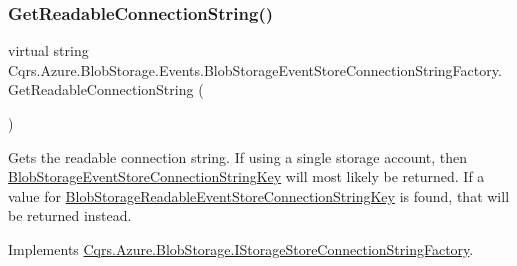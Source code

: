 \mbox{\label{classCqrs_1_1Azure_1_1BlobStorage_1_1Events_1_1BlobStorageEventStoreConnectionStringFactory_aa47606e4cd5a71437bed71e07fda53ed_aa47606e4cd5a71437bed71e07fda53ed}} 
\subsubsection{\texorpdfstring{Get\+Readable\+Connection\+String()}{GetReadableConnectionString()}}
{\footnotesize\ttfamily virtual string Cqrs.\+Azure.\+Blob\+Storage.\+Events.\+Blob\+Storage\+Event\+Store\+Connection\+String\+Factory.\+Get\+Readable\+Connection\+String (\begin{DoxyParamCaption}{ }\end{DoxyParamCaption})\hspace{0.3cm}{\ttfamily [virtual]}}



Gets the readable connection string. If using a single storage account, then \hyperlink{classCqrs_1_1Azure_1_1BlobStorage_1_1Events_1_1BlobStorageEventStoreConnectionStringFactory_a36edb24cf0ef60114fc344b5d0bb619d_a36edb24cf0ef60114fc344b5d0bb619d}{Blob\+Storage\+Event\+Store\+Connection\+String\+Key} will most likely be returned. If a value for \hyperlink{classCqrs_1_1Azure_1_1BlobStorage_1_1Events_1_1BlobStorageEventStoreConnectionStringFactory_a2b233edf7ad4cbc29872757006319527_a2b233edf7ad4cbc29872757006319527}{Blob\+Storage\+Readable\+Event\+Store\+Connection\+String\+Key} is found, that will be returned instead. 



Implements \hyperlink{interfaceCqrs_1_1Azure_1_1BlobStorage_1_1IStorageStoreConnectionStringFactory_a0ed836289e048767f753630bbcc98d5d_a0ed836289e048767f753630bbcc98d5d}{Cqrs.\+Azure.\+Blob\+Storage.\+I\+Storage\+Store\+Connection\+String\+Factory}.

